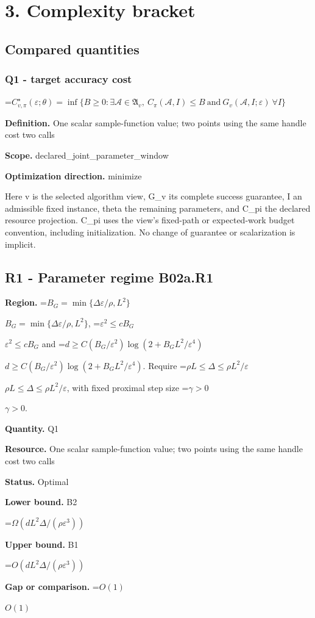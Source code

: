 \documentclass[10pt,a4paper]{article}
\newcommand{\AtlasMath}[1]{\par\begingroup\centering\setbox0=\hbox{$\displaystyle #1$}\ifdim\wd0>1.4\linewidth\typeout{ATLAS WIDE FORMULA: \the\wd0}\fi\ifdim\wd0>\linewidth\resizebox{\linewidth}{!}{\box0}\else\box0\fi\par\endgroup}
\newcommand{\AtlasInlineMath}[1]{\begingroup\setbox0=\hbox{$#1$}\ifdim\wd0>.4\linewidth\endgroup\AtlasMath{#1}\else\endgroup$#1$\fi}
\begin{document}
\section{3. Complexity bracket}
\subsection{Compared quantities}
\subsubsection{Q1 - target accuracy cost}
\AtlasMath{C^\star_{v,\pi}(\varepsilon;\theta)=\inf\{B\ge0:\exists\mathcal A\in\mathfrak A_v,\ C_\pi(\mathcal A,I)\le B\ \text{and}\ G_v(\mathcal A,I;\varepsilon)\ \forall I\}}
\textbf{Definition.} One scalar sample-function value; two points using the same handle cost two calls

\textbf{Scope.} declared\_joint\_parameter\_window

\textbf{Optimization direction.} minimize

Here v is the selected algorithm view, G\_v its complete success guarantee, I an admissible fixed instance, theta the remaining parameters, and C\_pi the declared resource projection. C\_pi uses the view's fixed-path or expected-work budget convention, including initialization. No change of guarantee or scalarization is implicit.

\subsection{R1 - Parameter regime B02a.R1}
\textbf{Region.} \AtlasInlineMath{B_G=\min\{\Delta\varepsilon/\rho,L^2\}}, \AtlasInlineMath{\varepsilon^2\le cB_G} and \AtlasInlineMath{d\ge C(B_G/\varepsilon^2)\log(2+B_GL^2/\varepsilon^4)}. Require \AtlasInlineMath{\rho L\le\Delta\le\rho L^2/\varepsilon}, with fixed proximal step size \AtlasInlineMath{\gamma>0}.

\textbf{Quantity.} Q1

\textbf{Resource.} One scalar sample-function value; two points using the same handle cost two calls

\textbf{Status.} Optimal

\textbf{Lower bound.} B2

\AtlasMath{\Omega(dL^2\Delta/(\rho\varepsilon^3))}
\textbf{Upper bound.} B1

\AtlasMath{O(dL^2\Delta/(\rho\varepsilon^3))}
\textbf{Gap or comparison.} \AtlasInlineMath{O(1)}
\end{document}
